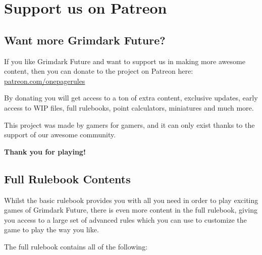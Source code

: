 \documentclass[9pt, a4paper, bookmarks=false]{extarticle}            %
\begin{document}
\newpage



\section{Support us on Patreon}

\begin{multicols}{2}

\subsection{Want more Grimdark Future?}

If you like Grimdark Future and want to support us in making more awesome content, then you can donate to the project on Patreon here: \href{http://patreon.com/onepagerules}{patreon.com/onepagerules}

By donating you will get access to a ton of extra content, exclusive updates, early access to WIP files, full rulebooks, point calculators, miniatures and much more.

This project was made by gamers for gamers, and it can only exist thanks to the support of our awesome community.

\textbf{Thank you for playing!}

\vfill\null

\columnbreak

\subsection{Full Rulebook Contents}

Whilst the basic rulebook provides you with all you need in order to play exciting games of Grimdark Future, there is even more content in the full rulebook, giving you access to a large set of advanced rules which you can use to customize the game to play the way you like.

The full rulebook contains all of the following:



\end{multicols}
\end{document}
